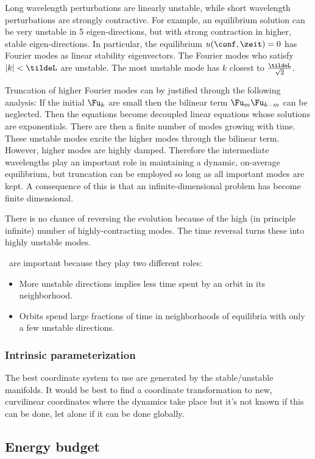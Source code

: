 Long wavelength perturbations are linearly unstable, while short
wavelength perturbations are strongly contractive. For example, an
equilibrium solution can be very unstable in 5 eigen-directions, but with
strong contraction in higher, stable eigen-directions. In particular, the
equilibrium $u(\conf,\zeit)=0$ has Fourier modes as linear stability
eigenvectors. The Fourier modes who satisfy $|k|<\tildeL$ are unstable.
The most unstable mode has $k$ closest to $\frac{\tildeL}{\sqrt{2}}$.

Truncation of higher Fourier modes can by justified through the following
analysis: If the initial $\Fu_k$ are small then the bilinear term $\Fu_m
\Fu_{k-m}$ can be neglected. Then the equations become decoupled linear
equations whose solutions are exponentials. There are then a finite
number of modes growing with time. These unstable modes excite the higher
modes through the bilinear term. However, higher modes are highly damped.
Therefore the intermediate wavelengths play an important role in
maintaining a dynamic, on-average equilibrium, but truncation can be
employed so long as all important modes are kept. A consequence of this
is that an infinite-dimensional problem has become finite dimensional.

There is no chance of reversing the evolution because of the high (in
principle infinite) number of highly-contracting modes. The time reversal
turns these into highly unstable modes.

\Eqva\ are important because they play two different roles:
\begin{itemize}
\item More unstable directions implies less time spent by an orbit in its neighborhood.
\item Orbits spend large fractions of time in neighborhoods of equilibria with only a few unstable directions.
\end{itemize}

\subsubsection{Intrinsic parameterization}
\label{sect:MNGintrPar}


The best coordinate system to use are generated by the stable/unstable manifolds. It would be best to find a coordinate transformation to new, curvilinear coordinates where the dynamics take place but it's not known if this can be done, let alone if it can be done globally.

\subsection{Energy budget}
\label{sect:MNGenBudg}


